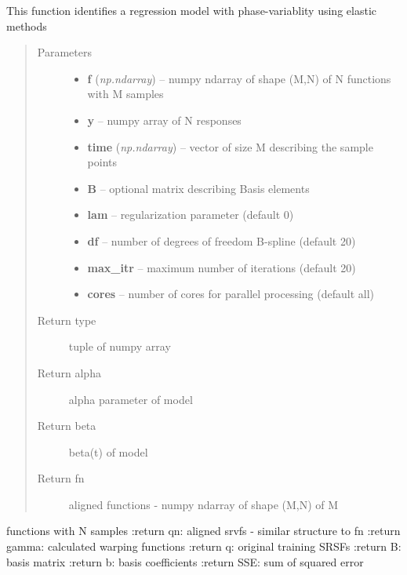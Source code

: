 \documentclass[letterpaper,10pt,english]{sphinxmanual}
\begin{document}
\begin{fulllineitems}
\label{regression:regression.elastic_regression}
This function identifies a regression model with phase-variablity
using elastic methods
\begin{quote}\begin{description}
\item[{Parameters}] \leavevmode\begin{itemize}
\item {} 
\textbf{f} (\emph{np.ndarray}) -- numpy ndarray of shape (M,N) of N functions with M samples

\item {} 
\textbf{y} -- numpy array of N responses

\item {} 
\textbf{time} (\emph{np.ndarray}) -- vector of size M describing the sample points

\item {} 
\textbf{B} -- optional matrix describing Basis elements

\item {} 
\textbf{lam} -- regularization parameter (default 0)

\item {} 
\textbf{df} -- number of degrees of freedom B-spline (default 20)

\item {} 
\textbf{max\_itr} -- maximum number of iterations (default 20)

\item {} 
\textbf{cores} -- number of cores for parallel processing (default all)

\end{itemize}

\item[{Return type}] \leavevmode
tuple of numpy array

\item[{Return alpha}] \leavevmode
alpha parameter of model

\item[{Return beta}] \leavevmode
beta(t) of model

\item[{Return fn}] \leavevmode
aligned functions - numpy ndarray of shape (M,N) of M

\end{description}\end{quote}

functions with N samples
:return qn: aligned srvfs - similar structure to fn
:return gamma: calculated warping functions
:return q: original training SRSFs
:return B: basis matrix
:return b: basis coefficients
:return SSE: sum of squared error

\end{fulllineitems}
\end{document}

